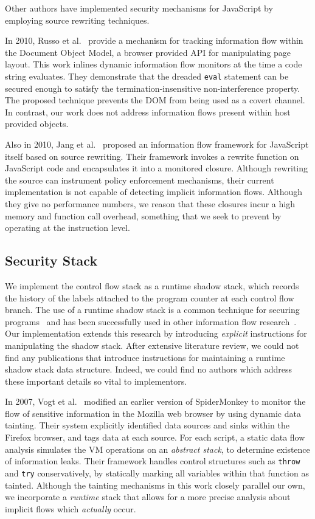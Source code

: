 \documentclass[preprint]{sigplanconf}
\begin{document}
Other authors have implemented security mechanisms for JavaScript by employing source rewriting techniques.

In 2010, Russo et al.~\cite{1813092} provide a mechanism for tracking information flow within the Document Object Model, a browser provided API for manipulating page layout.
This work inlines dynamic information flow monitors at the time a code string evaluates.
They demonstrate that the dreaded \texttt{eval} statement can be secured enough to satisfy the termination-insensitive non-interference property.
The proposed technique prevents the DOM from being used as a covert channel.
In contrast, our work does not address information flows present within host provided objects.

Also in 2010, Jang et al.~\cite{1866339} proposed an information flow framework for JavaScript itself based on source rewriting.
Their framework invokes a rewrite function on JavaScript code and encapsulates it into a monitored closure.
Although rewriting the source can instrument policy enforcement mechanisms, their current implementation is not capable of detecting implicit information flows.
Although they give no performance numbers, we reason that these closures incur a high memory and function call overhead, something that we seek to prevent by operating at the instruction level.

\subsection{Security Stack}
\label{sec:relatedwork-security-stack}

We implement the control flow stack as a runtime shadow stack, which records the history of the labels attached to the program counter at each control flow branch.
The use of a runtime shadow stack is a common technique for securing programs~\cite{abadi2009control, frantzen2001stackghost, prasad2003binary} and has been successfully used in other information flow research~\cite{lam2006general}.
Our implementation extends this research by introducing \emph{explicit} instructions for manipulating the shadow stack.
After extensive literature review, we could not find any publications that introduce instructions for maintaining a runtime shadow stack data structure.
Indeed, we could find no authors which address these important details so vital to implementors.

In 2007, Vogt et al.~\cite{Vogt_CrossSiteScripting_2007} modified an earlier version of SpiderMonkey to monitor the flow of sensitive information in the Mozilla web browser by using dynamic data tainting.
Their system explicitly identified data sources and sinks within the Firefox browser, and tags data at each source.
For each script, a static data flow analysis simulates the VM operations on an \emph{abstract stack}, to determine existence of information leaks.
Their framework handles control structures such as \texttt{throw} and \texttt{try} conservatively, by statically marking all variables within that function as tainted.
Although the tainting mechanisms in this work closely parallel our own, we incorporate a \emph{runtime} stack that allows for a more precise analysis about implicit flows which \emph{actually} occur.
\end{document}
